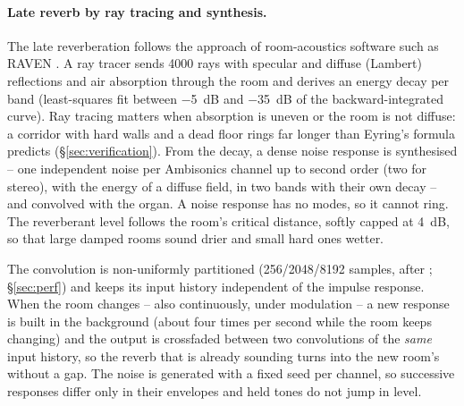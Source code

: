 \documentclass[11pt,a4paper,parskip=half,DIV=11,toc=bibliography]{scrartcl}
\begin{document}
\paragraph{Late reverb by ray tracing and synthesis.} The late reverberation follows the approach of
room-acoustics software such as RAVEN \citep{schroeder2011raven}. A ray tracer
\citep{krokstad1968} sends 4000 rays with specular and diffuse (Lambert) reflections and air absorption
through the room and derives an energy decay per band (least-squares fit between \SI{-5}{dB} and
\SI{-35}{dB} of the backward-integrated curve). Ray tracing matters when absorption is uneven or the room is
not diffuse: a corridor with hard walls and a dead floor rings far longer than Eyring's formula
\citep{eyring1930} predicts (\S\ref{sec:verification}). From the decay, a dense noise response is
synthesised -- one independent noise per Ambisonics channel up to second order (two for stereo), with the
energy of a diffuse field, in two bands with their own decay -- and convolved with the organ. A noise
response has no modes, so it cannot ring. The reverberant level follows the room's critical distance,
softly capped at \SI{+4}{dB}, so that large damped rooms sound drier and small hard ones wetter.

The convolution is non-uniformly partitioned (256/2048/8192 samples, after \citet{gardner1995}; \S\ref{sec:perf}) and keeps
its input history independent of the impulse response. When the room changes -- also continuously, under
modulation -- a new response is built in the background (about four times per second while the room keeps
changing) and the output is crossfaded between two convolutions of the \emph{same} input history, so the
reverb that is already sounding turns into the new room's without a gap. The noise is generated with a
fixed seed per channel, so successive responses differ only in their envelopes and held tones do not jump
in level.
\end{document}
